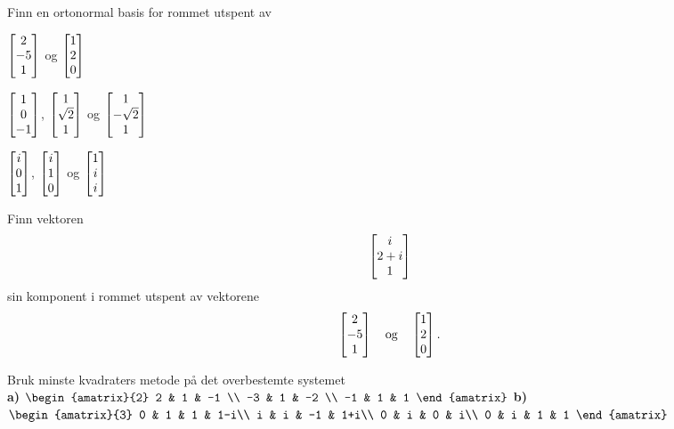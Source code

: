 \newpage

\begin{oppgave}
Finn en ortonormal basis for rommet utspent av%
\begin{punkt}
$\begin{bmatrix} 2 \\ -5 \\ 1 \end{bmatrix}$ og $\begin{bmatrix} 1 \\ 2 \\ 0 \end{bmatrix}$ \\[4pt]
\end{punkt}

\begin{punkt}
$\begin{bmatrix} 1 \\ 0 \\ -1 \end{bmatrix}$, $\begin{bmatrix} 1 \\ \sqrt{2} \\ 1 \end{bmatrix}$ og $\begin{bmatrix} 1 \\ -\sqrt{2} \\ 1 \end{bmatrix}$\\[4pt]
\end{punkt}

\begin{punkt}
$\begin{bmatrix} i \\ 0 \\ 1 \end{bmatrix}$, $\begin{bmatrix} i \\ 1 \\ 0 \end{bmatrix}$ og $\begin{bmatrix} 1 \\ i \\ i \end{bmatrix}$\\[4pt]
\end{punkt}

\end{oppgave}

\begin{oppgave}
Finn vektoren 
\[
\begin{bmatrix} i \\ 2+i \\ 1 \end{bmatrix}
\]
sin komponent i rommet utspent av vektorene 
\[
\begin{bmatrix} 2 \\ -5 \\ 1 \end{bmatrix}\quad  \text{og} \quad \begin{bmatrix} 1 \\ 2 \\ 0 \end{bmatrix}.
\]
\end{oppgave}

\begin{oppgave}
Bruk minste kvadraters metode på det overbestemte systemet \\
\textbf{a)}
$
\begin{amatrix}{2}
2 & 1 & -1 \\
-3 & 1 & -2 \\
 -1 & 1  & 1
\end{amatrix}
$
\hfill\textbf{b)}
$
\begin{amatrix}{3}
0 & 1 & 1  & 1-i\\
i & i & -1 & 1+i\\
 0 & i  & 0 & i\\
  0 & i  & 1 & 1
\end{amatrix}
$
\end{oppgave}

